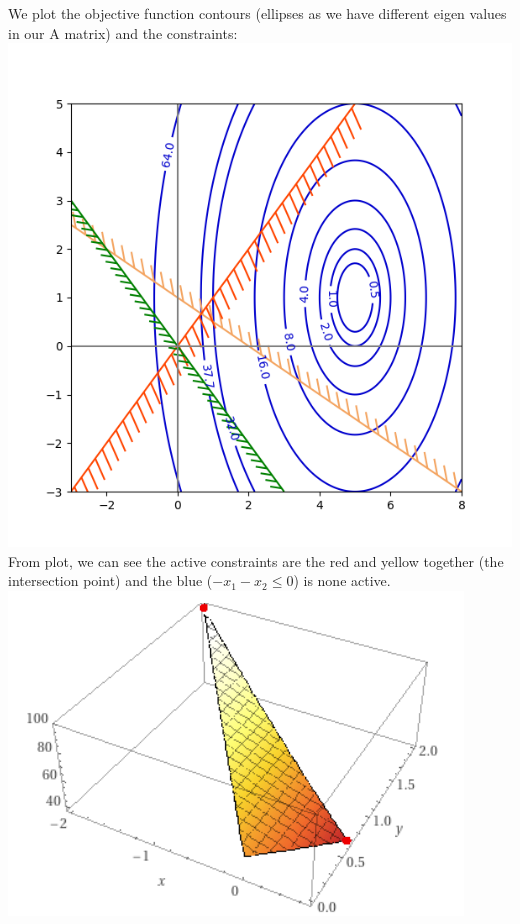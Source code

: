 \documentclass[12pt]{article}
\begin{document}
We plot the objective function contours (ellipses as we have different eigen values in our A matrix) and the constraints:\\
\includegraphics[scale=0.5]{hw4/plots/plot_1.png}\\
From plot, we can see the active constraints are the red and yellow together (the intersection point) and the blue ($-x_1- x_2 \leq 0$) is none active.\\
\includegraphics[scale=1]{hw4/plots/plot_2.png}\\
\end{document}
